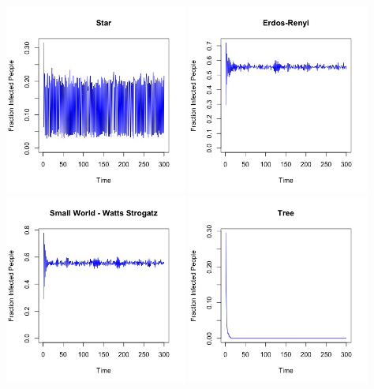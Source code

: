 \documentclass{article}
\begin{document}
\begin{center}
   
    
    \includegraphics[width=6cm]{star_3.jpeg}
    \includegraphics[width=6cm]{erdos_renyi_3.jpeg}
    \includegraphics[width=6cm]{watts_strogatz_3.jpeg}
    \includegraphics[width=6cm]{tree_3.jpeg}

\end{center}
\end{document}
